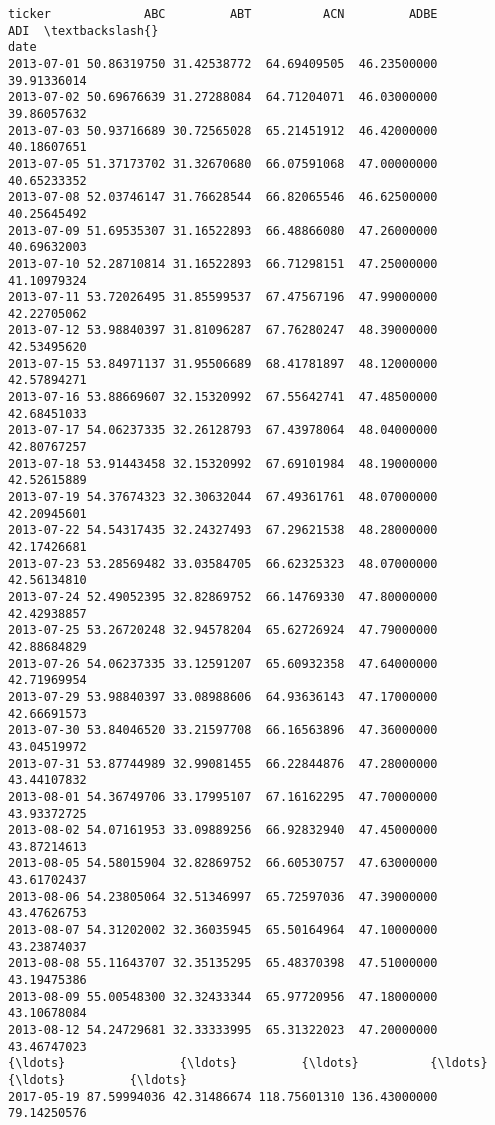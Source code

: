 \documentclass[11pt]{article}
\begin{document}
\begin{Verbatim}[commandchars=\\\{\}]
ticker             ABC         ABT          ACN         ADBE         ADI  \textbackslash{}
date                                                                       
2013-07-01 50.86319750 31.42538772  64.69409505  46.23500000 39.91336014   
2013-07-02 50.69676639 31.27288084  64.71204071  46.03000000 39.86057632   
2013-07-03 50.93716689 30.72565028  65.21451912  46.42000000 40.18607651   
2013-07-05 51.37173702 31.32670680  66.07591068  47.00000000 40.65233352   
2013-07-08 52.03746147 31.76628544  66.82065546  46.62500000 40.25645492   
2013-07-09 51.69535307 31.16522893  66.48866080  47.26000000 40.69632003   
2013-07-10 52.28710814 31.16522893  66.71298151  47.25000000 41.10979324   
2013-07-11 53.72026495 31.85599537  67.47567196  47.99000000 42.22705062   
2013-07-12 53.98840397 31.81096287  67.76280247  48.39000000 42.53495620   
2013-07-15 53.84971137 31.95506689  68.41781897  48.12000000 42.57894271   
2013-07-16 53.88669607 32.15320992  67.55642741  47.48500000 42.68451033   
2013-07-17 54.06237335 32.26128793  67.43978064  48.04000000 42.80767257   
2013-07-18 53.91443458 32.15320992  67.69101984  48.19000000 42.52615889   
2013-07-19 54.37674323 32.30632044  67.49361761  48.07000000 42.20945601   
2013-07-22 54.54317435 32.24327493  67.29621538  48.28000000 42.17426681   
2013-07-23 53.28569482 33.03584705  66.62325323  48.07000000 42.56134810   
2013-07-24 52.49052395 32.82869752  66.14769330  47.80000000 42.42938857   
2013-07-25 53.26720248 32.94578204  65.62726924  47.79000000 42.88684829   
2013-07-26 54.06237335 33.12591207  65.60932358  47.64000000 42.71969954   
2013-07-29 53.98840397 33.08988606  64.93636143  47.17000000 42.66691573   
2013-07-30 53.84046520 33.21597708  66.16563896  47.36000000 43.04519972   
2013-07-31 53.87744989 32.99081455  66.22844876  47.28000000 43.44107832   
2013-08-01 54.36749706 33.17995107  67.16162295  47.70000000 43.93372725   
2013-08-02 54.07161953 33.09889256  66.92832940  47.45000000 43.87214613   
2013-08-05 54.58015904 32.82869752  66.60530757  47.63000000 43.61702437   
2013-08-06 54.23805064 32.51346997  65.72597036  47.39000000 43.47626753   
2013-08-07 54.31202002 32.36035945  65.50164964  47.10000000 43.23874037   
2013-08-08 55.11643707 32.35135295  65.48370398  47.51000000 43.19475386   
2013-08-09 55.00548300 32.32433344  65.97720956  47.18000000 43.10678084   
2013-08-12 54.24729681 32.33333995  65.31322023  47.20000000 43.46747023   
{\ldots}                {\ldots}         {\ldots}          {\ldots}          {\ldots}         {\ldots}   
2017-05-19 87.59994036 42.31486674 118.75601310 136.43000000 79.14250576   

\end{Verbatim}
\end{document}
